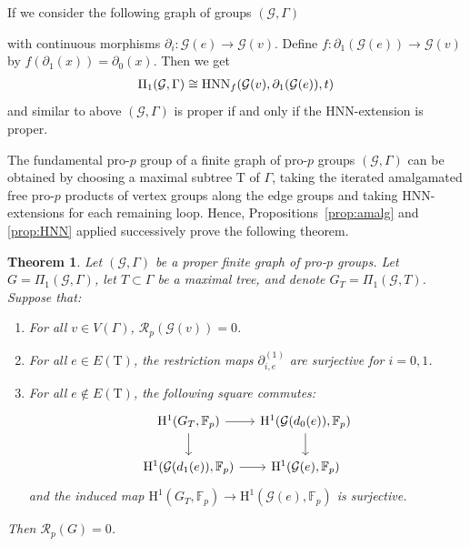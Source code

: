 \documentclass{amsart}
\newtheorem{thm}{Theorem}[section]
\theoremstyle{definition}
\theoremstyle{remark}
\newcommand{\HNN}{{\rm HNN}}
\newcommand{\FF}{\mathbb{F}}
\newcommand{\calR}{\mathcal{R}}
\newcommand{\calG}{\mathcal{G}}
\newcommand{\rmH}{\mathrm H}%
\begin{document}
If we consider the following graph of groups $(\calG,\Gamma)$ 
\begin{center}
\end{center}
with continuous morphisms $\partial_i:\calG(e)\to \calG(v)$. Define $f:\partial_1(\calG(e))\to \calG(v)$ by $f(\partial_1(x))=\partial_0(x)$. Then we get 
\begin{align*}
    \Pi_1(\calG,\Gamma)\cong \HNN_f(\calG(v),\partial_1(\calG(e)),t)
\end{align*}
and similar to above $(\calG,\Gamma)$ is proper if and only if the HNN-extension is proper.

The fundamental pro-$p$ group of a finite graph of pro-$p$ groups $(\calG,\Gamma)$ can be obtained by choosing a maximal subtree $\mathrm T$ of $\Gamma$, taking the iterated amalgamated free pro-$p$ products of vertex groups along the edge groups and taking \HNN-extensions for each remaining loop.
Hence, Propositions~\ref{prop:amalg} and \ref{prop:HNN} applied successively prove the following theorem.

\begin{thm}\label{thm:fundamentalgroupgeneral}
Let $(\calG, \Gamma)$ be a proper finite graph of pro-$p$ groups. Let $G = \Pi_1(\calG, \Gamma)$, let $T \subset \Gamma$ be a maximal tree, and denote $G_T = \Pi_1(\calG, T)$. Suppose that:
\begin{enumerate}[label=(\arabic*)]
\item \label{it:thm fundamental groups Gv trivial radical} For all $v \in V(\Gamma)$, $\calR_p(\calG(v)) = 0$.

\item \label{it:thm fundamental groups restriction maps surjective} For all $e \in E(\mathrm T)$, the restriction maps $\partial_{i,e}^{(1)}$ are surjective for $i = 0,1$.

\item \label{it:thm fundamental groups diagram commuatative} For all $e \not\in E(\mathrm T)$, the following square commutes:
\begin{equation*}
    \begin{tikzcd}[column sep=small]
        \rmH^1(G_T,\FF_p)\arrow[r]\arrow[d]&\rmH^1(\calG(d_0(e)),\FF_p)\arrow[d]\\
        \rmH^1(\calG(d_1(e)),\FF_p)\arrow[r]&\rmH^1(\calG(e),\FF_p)
    \end{tikzcd}
\end{equation*}
and the induced map $\rmH^1(G_T, \FF_p) \to \rmH^1(\calG(e), \FF_p)$ is surjective.
 \end{enumerate}
Then $\calR_p(G) = 0$.
\end{thm}
\end{document}
